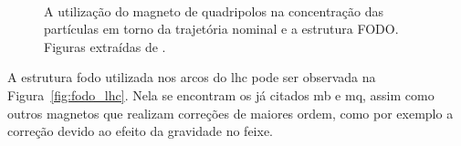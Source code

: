 \begin{figure}[ht!]
    \label{fig:quadripolos}
    \begin{center}
%
         \hspace{0.1\textwidth}
        \\ %
%
    \end{center}
    \caption[A utilização do magneto de quadripolos na concentração das partículas
em torno da trajetória nominal e estrutura FODO]{%
        A utilização do magneto de quadripolos na concentração das partículas em
      torno da trajetória nominal e a estrutura FODO. Figuras extraídas de 
      \cite{lecture_slides_1}.
     }%
\end{figure}


A estrutura \gls{fodo} utilizada nos arcos do \gls{lhc} pode ser observada na
Figura~\ref{fig:fodo_lhc}. Nela se encontram os já citados \gls{mb} e
\gls{mq}, assim como outros magnetos que realizam correções de maiores ordem,
como por exemplo a correção devido ao efeito da gravidade no feixe. 

